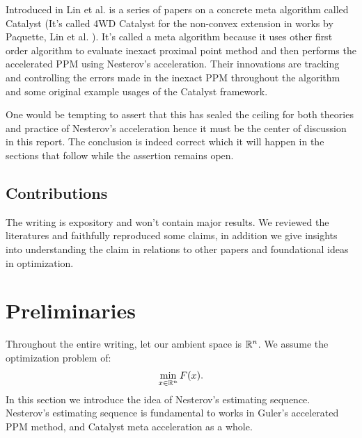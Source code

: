 \documentclass[12pt]{article}
\begin{document}
    Introduced in Lin et al. \cite{lin_universal_2015}\cite{lin_catalyst_2018} is a series of papers on a concrete meta algorithm called Catalyst (It's called 4WD Catalyst for the non-convex extension in works by Paquette, Lin et al. \cite{paquette_catalyst_2018}). 
    It's called a meta algorithm because it uses other first order algorithm to evaluate inexact proximal point method and then performs the accelerated PPM using Nesterov's acceleration. 
    Their innovations are tracking and controlling the errors made in the inexact PPM throughout the algorithm and some original example usages of the Catalyst framework. 

    One would be tempting to assert that this has sealed the ceiling for both theories and practice of Nesterov's acceleration hence it must be the center of discussion in this report. 
    The conclusion is indeed correct which it will happen in the sections that follow while the assertion remains open.  

    
    \subsection{Contributions}
        The writing is expository and won't contain major results. 
        We reviewed the literatures and faithfully reproduced some claims, in addition we give insights into understanding the claim in relations to other papers and foundational ideas in optimization. 

    
\section{Preliminaries}\label{sec:preliminaries}
    Throughout the entire writing, let our ambient space is $\mathbb R^n$. 
    We assume the optimization problem of: 
    \begin{align*}
        \min_{x \in \mathbb R^n} F(x). 
    \end{align*}
    In this section we introduce the idea of Nesterov's estimating sequence. 
    Nesterov's estimating sequence is fundamental to works in Guler's accelerated PPM method, and Catalyst meta acceleration as a whole. 
\end{document}
